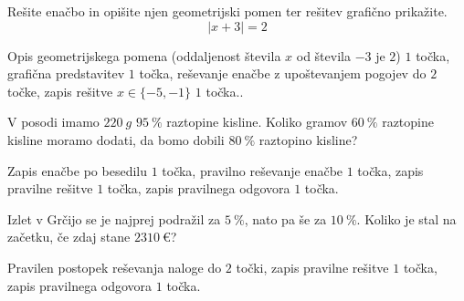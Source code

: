 \documentclass[addpoints]{exam}
\begin{document}
\begin{questions}
    \question[5]
    Rešite enačbo in opišite njen geometrijski pomen ter rešitev grafično prikažite.
    $$  \left\lvert x+3\right\rvert=2 $$
    
    
    \begin{solution}[8cm]
        Opis geometrijskega pomena (oddaljenost števila $x$ od števila $-3$ je $2$) $1$ točka, grafična predstavitev $1$ točka, reševanje enačbe z upoštevanjem pogojev do $2$ točke, zapis rešitve $x\in\{-5,-1\}$ $1$ točka..
    \end{solution}


    \newpage





    
    



    \question[4]
    V posodi imamo $220~g$ $95~\%$ raztopine kisline. Koliko gramov $60~\%$ raztopine kisline moramo dodati, da bomo dobili $80~\%$ raztopino kisline?
    
    
    \begin{solution}[10cm]
        Zapis enačbe po besedilu $1$ točka, pravilno reševanje enačbe $1$ točka, zapis pravilne rešitve $1$ točka, zapis pravilnega odgovora $1$ točka.
    \end{solution}





    \question[4]
    Izlet v Grčijo se je najprej podražil za $5~\%$, nato pa še za $10~\%$. 
    Koliko je stal na začetku, če zdaj stane $2310~€$?
    
    
    \begin{solution}[3cm]
        Pravilen postopek reševanja naloge do $2$ točki, zapis pravilne rešitve $1$ točka, zapis pravilnega odgovora $1$ točka.
    \end{solution}

     \newpage




\end{questions}
\end{document}
